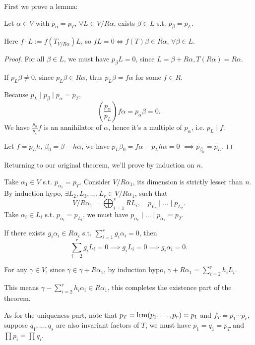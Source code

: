 First we prove a lemma:
\begin{lemma}
	Let $\alpha\in V$ with $p_\alpha = p_T$, $\forall L \in V / R\alpha$,
	exists $\beta\in L$ s.t. $p_\beta = p_L$.

	Here $f\cdot L := f(T_{V / R\alpha}) L$, so $fL=0\iff f(T)\beta\in R\alpha$,
	$\forall \beta\in L$.
\end{lemma}
\begin{proof}[Proof]
    For all $\beta\in L$, we must have $p_\beta L=0$,
	since $L = \beta + R\alpha, T(R\alpha) = R\alpha$.

	If $p_L\beta \ne 0$, since $p_L \beta\in R\alpha$,
	thus $p_L \beta = f\alpha$ for some $f\in R$.

	Because $p_L \mid p_\beta \mid p_\alpha = p_T$,
	\[
	\left( \frac{p_\alpha}{p_L} \right)f\alpha = p_\alpha \beta = 0.
	\]
	We have $\frac{p_\alpha}{p_L}f$ is an annihilator of $\alpha$,
	hence it's a multiple of $p_\alpha$, i.e.  $p_L \mid f$.

	Let $f = p_L h$, $\beta_0 = \beta - h\alpha$,
	we have $p_L\beta_0 = f\alpha - p_L h \alpha = 0$
	$\implies p_{\beta_0} = p_L$.
\end{proof}

Returning to our original theorem,
we'll prove by induction on $n$.

Take $\alpha_1\in V$ s.t. $p_{\alpha_1} = p_T$.
Consider $V / R\alpha_1$, its dimension is strictly lesser than $n$.
By induction hypo, $\exists L_2, L_3, \dots, L_r\in V / R\alpha_1$,
such that
\[
V / R\alpha_1 = \bigoplus _{i=1}^r RL_i, \quad p_{L_r}\mid \dots \mid p_{L_2}.
\]
Take $\alpha_i \in L_i$ s.t. $p_{\alpha_i} = p_{L_i}$,
we must have $p_{\alpha_r} \mid \dots \mid p_{\alpha_1} = p_T$.

If there exists $g_i\alpha_i \in R\alpha_i$ s.t. $\sum_{i=1}^r g_i\alpha_i = 0$,
then
\[
	\sum_{i=2}^r g_iL_i = 0 \implies g_i L_i = 0 \implies g_i\alpha_i = 0.
\]

For any $\gamma \in V$, since $\gamma \in \gamma+R\alpha_1$,
by induction hypo, $\gamma + R\alpha_1 = \sum_{i=2}^{r} h_iL_i$.

This means $\gamma - \sum_{i=2}^{r} h_i \alpha_i \in R\alpha_1$,
this completes the existence part of the theorem.
\vspace{1ex}

As for the uniqueness part,
note that $p_T = \operatorname{lcm}(p_1,\dots,p_r) = p_1$ and $f_T = p_1\cdots p_r$,
suppose $q_1,\dots,q_s$ are also invariant factors of $T$,
we must have $p_1=q_1=p_T$ and $\prod p_i = \prod q_i$.

